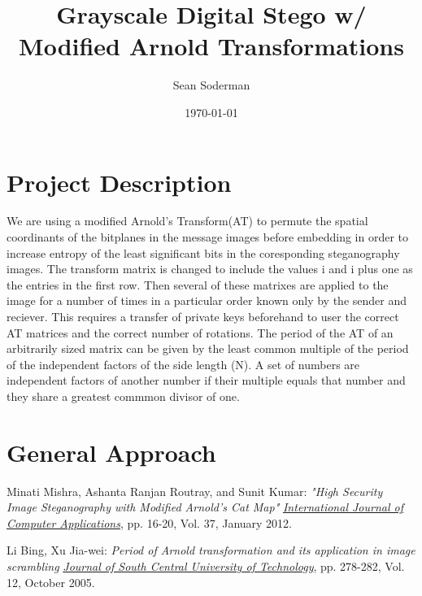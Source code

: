 \documentclass{article}
\begin{document}
\title{Grayscale Digital Stego w/ Modified Arnold Transformations}
\author{Sean Soderman}
\date{\today}
\maketitle

\section{Project Description}
We are using a modified Arnold's Transform(AT) to permute the spatial coordinants of the bitplanes in the message images
before embedding in order to increase entropy of the least significant bits in the coresponding steganography images. The transform
matrix is changed to include the values i and i plus one as the entries in the first row. Then several of these matrixes are applied
to the image for a number of times in a particular order known only by the sender and reciever. This requires a transfer of private
keys beforehand to user the correct AT matrices and the correct number of rotations. The period of the AT of an arbitrarily sized
matrix can be given by the least common multiple of the period of the independent factors of the side length (N). A set of numbers
are independent factors of another number if their multiple equals that number and they share a greatest commmon divisor of one.


\section{General Approach}

\begin{thebibliography}{9}
Minati Mishra, Ashanta Ranjan Routray, and Sunit Kumar:
\textit{"High Security Image Steganography with Modified Arnold's Cat Map"}
\textit{\underline{International Journal of Computer Applications}}, pp. 16-20,
Vol. 37, January 2012.

Li Bing, Xu Jia-wei:
\textit{Period of Arnold transformation and its application in image scrambling}
\textit{\underline{Journal of South Central University of Technology}}, pp. 278-282,
Vol. 12, October 2005.

\end{thebibliography}
\end{document}

